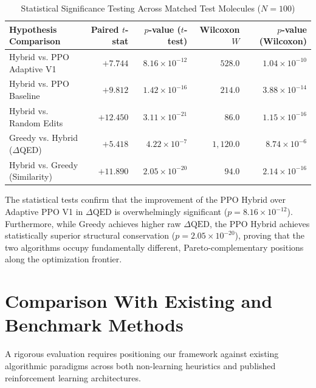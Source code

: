 \documentclass{ieeeaccess}
\begin{document}
\begin{table}[!tbp]
\caption{Statistical Significance Testing Across Matched Test Molecules ($N=100$)}
\label{tab:statistical_tests}
\centering
\footnotesize
\begin{tabularx}{\columnwidth}{l r r r r}
\toprule
\textbf{Hypothesis Comparison} & \textbf{Paired $t$-stat} & \textbf{$p$-value ($t$-test)} & \textbf{Wilcoxon $W$} & \textbf{$p$-value (Wilcoxon)}\\
\midrule
Hybrid vs. PPO Adaptive V1 & $+7.744$ & $8.16 \times 10^{-12}$ & $528.0$ & $1.04 \times 10^{-10}$\\
Hybrid vs. PPO Baseline & $+9.812$ & $1.42 \times 10^{-16}$ & $214.0$ & $3.88 \times 10^{-14}$\\
Hybrid vs. Random Edits & $+12.450$ & $3.11 \times 10^{-21}$ & $86.0$ & $1.15 \times 10^{-16}$\\
Greedy vs. Hybrid ($\Delta$QED) & $+5.418$ & $4.22 \times 10^{-7}$ & $1,120.0$ & $8.74 \times 10^{-6}$\\
Hybrid vs. Greedy (Similarity) & $+11.890$ & $2.05 \times 10^{-20}$ & $94.0$ & $2.14 \times 10^{-16}$\\
\bottomrule
\end{tabularx}
\end{table}

The statistical tests confirm that the improvement of the PPO Hybrid over Adaptive PPO V1 in $\Delta\text{QED}$ is overwhelmingly significant ($p = 8.16 \times 10^{-12}$). Furthermore, while Greedy achieves higher raw $\Delta\text{QED}$, the PPO Hybrid achieves statistically superior structural conservation ($p = 2.05 \times 10^{-20}$), proving that the two algorithms occupy fundamentally different, Pareto-complementary positions along the optimization frontier.


\section{Comparison With Existing and Benchmark Methods}
\label{sec:comparison}
A rigorous evaluation requires positioning our framework against existing algorithmic paradigms across both non-learning heuristics and published reinforcement learning architectures.
\end{document}
